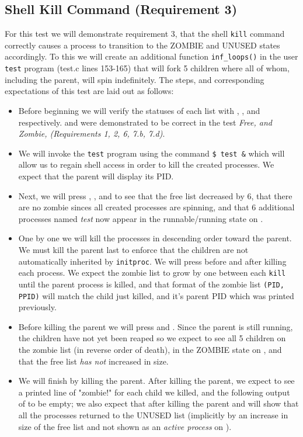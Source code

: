 \documentclass[11pt,letterpaper]{report}
\begin{document}
\subsection*{Shell Kill Command (Requirement 3)}
For this test we will demonstrate requirement 3, that the shell {\tt kill} command correctly causes a process to transition to the ZOMBIE and UNUSED states accordingly. To this we will create an additional function {\tt inf\_loops()} in the user
{\tt test} program (test.c lines 153-165) that will fork 5 children where all of whom, including the parent, will spin indefinitely. The steps, and corresponding expectations of this test are laid out as follows:
	
	\begin{itemize}

		\item Before beginning we will verify the statuses of each list with , , and  respectively.  and  were demonstrated to be correct in the test \emph{Free,  and 
			Zombie,   (Requirements 1, 2, 6, 7.b, 7.d)}.
		\item We will invoke the {\tt test} program using the command {\tt \$ test \&} which will allow us to regain shell access in order to kill the created processes. We expect that the parent will display its PID. 
		\item Next, we will press , , and  to see that the free list decreased by 6, that there are no zombie sinces all created processes are spinning, and that 6 additional 
			processes named \emph{test} now appear in the runnable/running state on .
		\item One by one we will kill the processes in descending order toward the parent. We must kill the parent last to enforce that the children are not automatically inherited by {\tt initproc}. We will press  before
			and after killing each process. We expect the zombie list to grow by one between each {\tt kill} until the parent process is killed, and that format of the zombie list {\tt (PID, PPID)} will match the child just
			killed, and it's parent PID which was printed previously.
		\item Before killing the parent we will press  and . Since the parent is still running, the children have not yet been reaped so we expect to see all 5 children on the zombie list (in reverse order of death),
			in the ZOMBIE state on , and that the free list \emph{has not} increased in size.
		\item We will finish by killing the parent. After killing the parent, we expect to see a printed line of "zombie!" for each child we killed, and the following output of  to be empty; we also expect
			that after killing the parent   and  will show that all the processes returned to the UNUSED list (implicitly by an increase in size of the free list and not shown as an \emph{active process}
			on ).
			
	\end{itemize}
\end{document}
